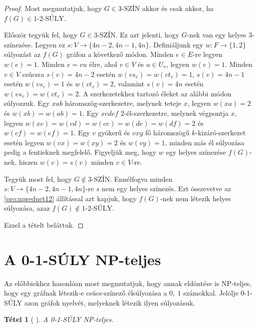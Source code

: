 \documentclass[12pt, a4paper]{report}
\newtheorem{tét}{Tétel}[section]
\theoremstyle{remark}
\theoremstyle{definition}
\begin{document}
\begin{proof}
Most megmutatjuk, hogy $G \in \textrm{3-SZÍN}$ akkor és csak akkor, ha $f(G) \in \textrm{1-2-SÚLY}$.

Először tegyük fel, hogy $G \in \textrm{3-SZÍN}$. Ez azt jelenti, hogy $G$-nek van egy helyes $3$-színezése. Legyen ez $s: V \rightarrow \lbrace 4n - 2, 4n - 1, 4n \rbrace$. Definiáljunk egy $w: F \rightarrow \lbrace 1, 2 \rbrace$ súlyozást az $f(G)$ gráfon a következő módon. Minden $e \in E$-re legyen $w(e) = 1$. Minden $e = vu$ élre, ahol $v \in V$ és $u \in U_v$, legyen $w(e) = 1$. Minden $v \in V$ csúcsra $s(v) = 4n - 2$ esetén $w(vs_v) = w(vt_v) = 1$, $s(v) = 4n - 1$ esetén $w(vs_v) = 1$ és $w(vt_v) = 2$, valamint $s(v) = 4n$ esetén $w(vs_v) = w(vt_v) = 2$. A szerkezetekhez tartozó éleket az alábbi módon súlyozzuk. Egy $xab$ háromszög-szerkezetre, melynek teteje $x$, legyen $w(xa) = 2$ és $w(xb) = w(ab) = 1$. Egy $xcdef$ $2$-él-szerkezetre, melynek végpontja $x$, legyen $w(xc) = w(cd) = w(ce) = w(de) = w(df) = 2$ és $w(cf) = w(ef) = 1$. Egy $v$ gyökerű és $vxy$ fő háromszögű $k$-kizáró-szerkezet esetén legyen $w(vx) = w(xy) = 2$ és $w(vy) = 1$, minden más él súlyozása pedig a fentieknek megfelelő. Figyeljük meg, hogy $w$ egy helyes színezése $f(G)$-nek, hiszen $w(v) = s(v)$ minden $v \in V$-re.

Tegyük most fel, hogy $G \notin \textrm{3-SZÍN}$. Ennélfogva minden $s: V \rightarrow \lbrace 4n - 2, 4n - 1, 4n \rbrace$-re $s$ nem egy helyes színezés. Ezt összevetve az \ref{pro:npreduct12} állítással azt kapjuk, hogy $f(G)$-nek nem létezik helyes súlyozása, azaz $f(G) \notin \textrm{1-2-SÚLY}$.

Ezzel a tételt beláttuk.
\end{proof}

\section{A 0-1-SÚLY NP-teljes}
Az előbbiekhez hasonlóan most megmutatjuk, hogy annak eldöntése is NP-teljes, hogy egy gráfnak létezik-e csúcs-színező élsúlyozása a $0,\ 1$ számokkal. Jelölje 0-1-SÚLY azon gráfok nyelvét, melyeknek létezik ilyen súlyozásuk.

\begin{tét}[\citeauthor{Dudek2011} \cite{Dudek2011}]
A 0-1-SÚLY NP-teljes.
\end{tét}
\end{document}
